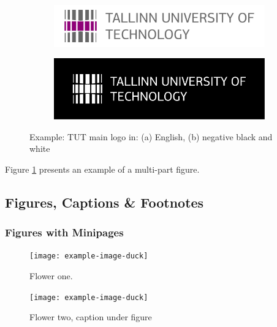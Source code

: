 \begin{figure}[!ht]
  \centering
  \begin{subfigure}[b]{0.45\textwidth}
    \includegraphics[width=\textwidth]{chExamples2/figures/TTU_peamine_logo_ENG_print}
    \caption{}
  \end{subfigure}
  \hfill
  \begin{subfigure}[b]{0.45\textwidth}
    \includegraphics[width=\textwidth]{chExamples2/figures/ttu_peamine_logo_eng_must-valge_negatiivis}
    \caption{}
  \end{subfigure}
  \caption{Example: TUT main logo in: (a) English, (b) negative black and white}
  \label{fig:logo3}
\end{figure}

Figure \ref{fig:logo3} presents an example of a multi-part figure.


\FloatBarrier
\subsection{Figures, Captions \& Footnotes}
\subsubsection{Figures with Minipages}
\begin{figure}[H]
	\centering
	\begin{minipage}[b]{0.4\textwidth}
		\texttt{[image: example-image-duck]}
		\caption{Flower one.}
	\end{minipage}
	\hfill
	\begin{minipage}[b]{0.4\textwidth}
		\texttt{[image: example-image-duck]}
		\caption[Flower two, caption in list of figures]{Flower two, caption under figure}
	\end{minipage}
\end{figure}

